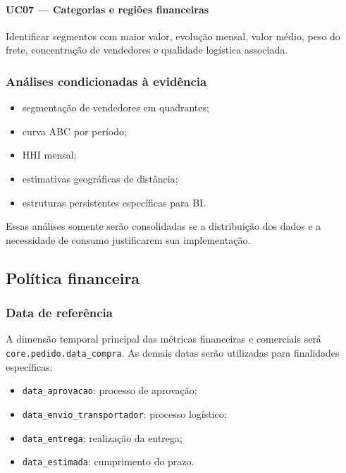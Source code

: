 \documentclass[12pt,a4paper]{article}
\providecommand{\tightlist}{
  \setlength{\itemsep}{0pt}\setlength{\parskip}{0pt}
}
\begin{document}
\paragraph{UC07 --- Categorias e regiões
financeiras}\label{docs__analytics__contrato_analitico.md__uc07-categorias-e-regiuxf5es-financeiras}

Identificar segmentos com maior valor, evolução mensal, valor médio,
peso do frete, concentração de vendedores e qualidade logística
associada.

\subsubsection{Análises condicionadas à
evidência}\label{docs__analytics__contrato_analitico.md__anuxe1lises-condicionadas-uxe0-eviduxeancia}

\begin{itemize}
\tightlist
\item
  segmentação de vendedores em quadrantes;
\item
  curva ABC por período;
\item
  HHI mensal;
\item
  estimativas geográficas de distância;
\item
  estruturas persistentes específicas para BI.
\end{itemize}

Essas análises somente serão consolidadas se a distribuição dos dados e
a necessidade de consumo justificarem sua implementação.

\subsection{Política
financeira}\label{docs__analytics__contrato_analitico.md__poluxedtica-financeira}

\subsubsection{Data de
referência}\label{docs__analytics__contrato_analitico.md__data-de-referuxeancia}

A dimensão temporal principal das métricas financeiras e comerciais será
\nolinkurl{core.pedido.data_compra}. As demais datas serão utilizadas
para finalidades específicas:

\begin{itemize}
\tightlist
\item
  \nolinkurl{data_aprovacao}: processo de aprovação;
\item
  \nolinkurl{data_envio_transportador}: processo logístico;
\item
  \nolinkurl{data_entrega}: realização da entrega;
\item
  \nolinkurl{data_estimada}: cumprimento do prazo.
\end{itemize}
\end{document}
